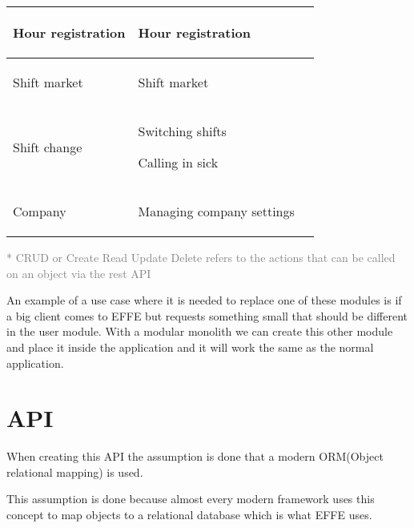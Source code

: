 \begin{tabularx}{\linewidth}{|>{}X|>{}X|>{}X|}
    Hour registration
     &
    \begin{compactitem}
        \item Hour registration
    \end{compactitem}
    \\ \hline

    Shift market
     &
    \begin{compactitem}
        \item Shift market
    \end{compactitem}
    \\ \hline

    Shift change
     &
    \begin{compactitem}
        \item Switching shifts
        \item Calling in sick
    \end{compactitem}
    \\ \hline

    Company
     &
    \begin{compactitem}
        \item Managing company settings
    \end{compactitem}
    \\ \hline
\end{tabularx}

\small{\textcolor{gray}{* CRUD or Create Read Update Delete refers to the actions that can be called on an object via the rest API}}

An example of a use case where it is needed to replace one of these modules is if a big client comes to EFFE but requests something small that should be different in the user module. With a modular monolith we can create this other module and place it inside the application and it will work the same as the normal application.

\section{API}
\label{sec:API}

When creating this API the assumption is done that a modern ORM(Object relational mapping) is used.


This assumption is done because almost every modern framework uses this concept to map objects to a relational database which is what EFFE uses.


